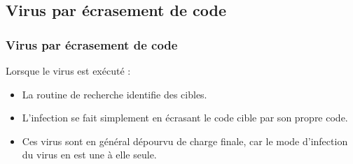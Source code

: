 \documentclass{beamer}
\begin{document}
\subsection{Virus par écrasement de code}


\begin{frame}
\frametitle{Virus par écrasement de code}
Lorsque le virus est exécuté : 
\begin{itemize}
\item La routine de recherche identifie des cibles.
\item L'infection se fait simplement en écrasant le code cible par son propre code.
\item Ces virus sont en général dépourvu de charge finale, car le  mode d'infection du virus en est une à elle seule.
\end{itemize}
\end{frame}
\end{document}
